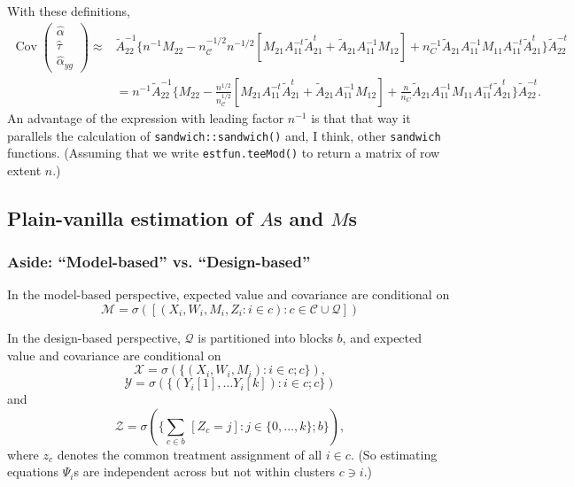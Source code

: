 \documentclass{article}
\begin{document}
With these definitions,
\begin{align}
  \operatorname{Cov}\begin{pmatrix}\hat\alpha \\ \hat\tau \\ \hat{\alpha}_{yg}\end{pmatrix} \approx& \tilde{A}_{22}^{-1}\{n^{-1} M_{22} -
                                 n_{\mathcal{C}}^{-1/2}n^{-1/2}[M_{21}A_{11}^{-t}\tilde{A}_{21}^t
                                 + \tilde{A}_{21}A_{11}^{-1}M_{12}] +
                                 n_C^{-1}\tilde{A}_{21}A_{11}^{-1}M_{11}A_{11}^{-t}\tilde{A}_{21}^{t}\}\tilde{A}_{22}^{-t}\nonumber
  \\
                               &= n^{-1}\tilde{A}_{22}^{-1}\{
                                 M_{22} -
                                 \frac{n^{1/2}}{n_{\mathcal{C}}^{1/2}}[M_{21}A_{11}^{-t}\tilde{A}_{21}^t
                                 + \tilde{A}_{21}A_{11}^{-1}M_{12}] +
                                 \frac{n}{n_C}\tilde{A}_{21}A_{11}^{-1}M_{11}A_{11}^{-t}\tilde{A}_{21}^{t}\}\tilde{A}_{22}^{-t}
                                . \label{eq:6}
\end{align}
An advantage of the expression with leading factor $n^{-1}$ is that
that way it parallels the calculation of
\texttt{sandwich::sandwich()} and, I think, other \texttt{sandwich}
functions. (Assuming that we write
\texttt{estfun.teeMod()}  to return a matrix of row extent
$n$.)

  \subsection{Plain-vanilla estimation of $A$s and $M$s}
\subsubsection {Aside: ``Model-based'' vs. ``Design-based''}\label{sec:des-vs-mod-based}

In the model-based perspective, expected value and covariance are
conditional on
\[ \mathcal{M} = \sigma\left(\left[(X_{i}, W_{i}, M_{i}, Z_{i}: i \in c): c \in
      \mathcal{C}\cup \mathcal{Q} \right]\right)\]


In the design-based perspective, $\mathcal{Q}$ is partitioned into
blocks $b$, and expected value and covariance are
conditional on
\[\mathcal{X} = \sigma(\{(X_{i}, W_{i}, M_{i}): i \in c; c\}),\]
\[\mathcal{Y} = \sigma(\{(Y_{i}[1], \ldots Y_{i}[k]): i \in c; c\})\]
and
\[\mathcal{Z} = \sigma(\{\sum_{c \in b}\, \![Z_{c}=j\!] : j \in \{0, \ldots, k\}; b\} ),\]
where $z_{c}$ denotes the common treatment assignment of all $i\in
c$. (So estimating equations ${\Psi}_{i}$s are independent across but not within
clusters $c \ni i$.)
\end{document}
